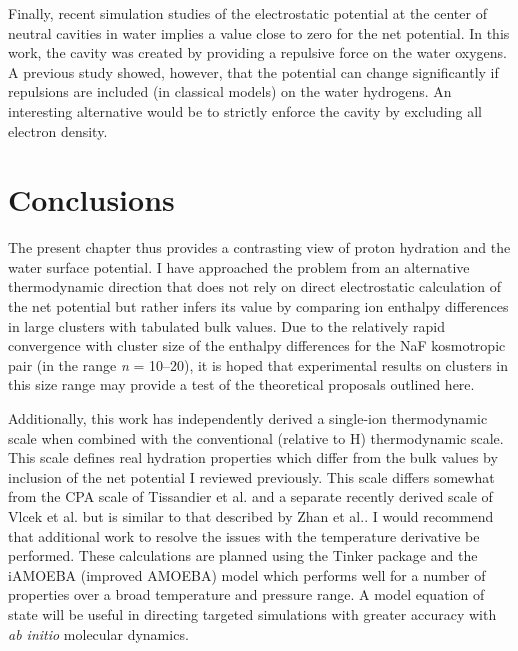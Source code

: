\begin{cpa}
  Finally, recent simulation studies of the electrostatic potential at the center of neutral cavities in water implies a value close to zero for the net 
  potential\cite{baer2012electrochemical,remsing2014lp}. In this work, the cavity was created by providing a repulsive force on the water oxygens. A previous study\cite{shi2013length} 
  showed, however, that the potential can change significantly if repulsions are included (in classical models) on the water hydrogens. An interesting alternative would be to 
  strictly enforce the cavity by excluding all electron density.

  \section{\label{ch5:sec5:level1}Conclusions~}
  The present chapter thus provides a contrasting view of proton hydration and the water surface potential. I have approached the problem from an alternative 
  thermodynamic direction that does not rely on direct electrostatic calculation of the net potential but rather infers its value by comparing ion enthalpy differences
  in large clusters with tabulated bulk values. Due to the relatively rapid convergence with cluster size of the enthalpy differences for the NaF kosmotropic pair (in
  the range \emph{n} = 10--20), it is hoped that experimental results on clusters in this size range may provide a test of the theoretical proposals outlined here.
  
  Additionally, this work has independently derived a single-ion thermodynamic scale when combined with the conventional (relative to H\sur{+}) thermodynamic scale.
  This scale defines real hydration properties which differ from the bulk values by inclusion of the net potential I reviewed previously. This scale differs somewhat 
  from the CPA scale of Tissandier et al.\cite{coe1998cpa1} and a separate recently derived scale of Vlcek et al.\cite{vlcek2013cpa} but is similar to that described 
  by Zhan et al.\cite{zhan2001absolute}. I would recommend that additional work to resolve the issues with the temperature derivative be performed. These calculations
  are planned using the Tinker package\cite{ponder2004tinker} and the iAMOEBA (improved AMOEBA) model which performs well for a number of properties over a broad 
  temperature and pressure range. A model equation of state will be useful in directing targeted simulations with greater accuracy with \emph{ab initio} molecular dynamics.

\end{cpa}